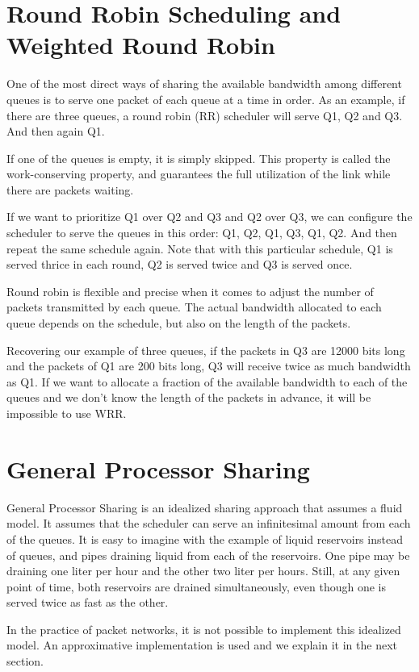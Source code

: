 \section{Round Robin Scheduling and Weighted Round Robin}

One of the most direct ways of sharing the available bandwidth among different queues is to serve one packet of each queue at a time in order.
As an example, if there are three queues, a round robin (RR) scheduler will serve Q1, Q2 and Q3.
And then again Q1.

If one of the queues is empty, it is simply skipped.
This property is called the work-conserving property, and guarantees the full utilization of the link while there are packets waiting.

If we want to prioritize Q1 over Q2 and Q3 and Q2 over Q3, we can configure the scheduler to serve the queues in this order: Q1, Q2, Q1, Q3, Q1, Q2.
And then repeat the same schedule again.
Note that with this particular schedule, Q1 is served thrice in each round, Q2 is served twice and Q3 is served once.

Round robin is flexible and precise when it comes to adjust the number of packets transmitted by each queue.
The actual bandwidth allocated to each queue depends on the schedule, but also on the length of the packets.

Recovering our example of three queues, if the packets in Q3 are 12000 bits long and the packets of Q1 are 200 bits long, Q3 will receive twice as much bandwidth as Q1.
If we want to allocate a fraction of the available bandwidth to each of the queues and we don't know the length of the packets in advance, it will be impossible to use WRR.

\section{General Processor Sharing}

General Processor Sharing is an idealized sharing approach that assumes a fluid model.
It assumes that the scheduler can serve an infinitesimal amount from each of the queues.
It is easy to imagine with the example of liquid reservoirs instead of queues, and pipes draining liquid from each of the reservoirs.
One pipe may be draining one liter per hour and the other two liter per hours.
Still, at any given point of time, both reservoirs are drained simultaneously, even though one is served twice as fast as the other.

In the practice of packet networks, it is not possible to implement this idealized model.
An approximative implementation is used and we explain it in the next section.

